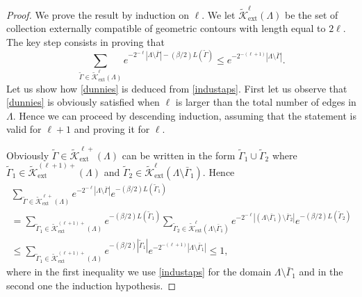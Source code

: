 \documentclass[10pt]{amsart}
\let\mathcal\mathscr
\numberwithin{equation}{section}
\theoremstyle{plain}
\theoremstyle{definition}
\newcommand{\ext}{\mathrm{ext}}
\newcommand{\cK}{{\ensuremath{\mathcal K}} }
\newcommand{\gb}{\beta}
\newcommand{\gG}{\Gamma}
\newcommand{\gL}{\Lambda}
\begin{document}
\begin{proof}
We prove the result by induction on $\ell$. We let $\tilde \cK^{\ell}_{\ext}(\gL)$ be
the set of collection externally compatible of geometric contours with length equal to $2\ell$.
The key step consists in proving that
\begin{equation}\label{industaps}
\sum_{\tilde \gG\in \tilde \cK^{\ell}_{\ext}(\gL)} e^{-2^{-\ell} |\gL\setminus \bar \gG|-(\gb/2) L(\tilde\gG)}\le e^{-2^{-(\ell+1)} |\gL\setminus \bar \gG|}.
\end{equation}
Let us show how \eqref{dunnies} is deduced from \eqref{industaps}.
First let us observe that \eqref{dunnies} is obviously satisfied when $\ell$ is larger than the total number of edges in $\gL$. Hence we can proceed
by descending induction, assuming that the
statement is valid for $\ell+1$ and proving it for $\ell$.

Obviously $\tilde \gG \in \tilde \cK^{\ell+}_{\ext}(\gL)$ can be written in the form $\tilde \gG_1\cup \tilde \gG_2$ where $\tilde \gG_1\in \tilde \cK^{(\ell+1)+}_{\ext}(\gL)$
and $\tilde \gG_2\in \tilde\cK^{\ell}_{\ext}(\gL \setminus \bar \gG_1)$.
Hence\vspace*{-3pt}
\begin{multline*}
\sum_{\tilde \gG\in \tilde \cK^{\ell+}_{\ext}(\gL)} e^{-2^{-\ell} |\gL\setminus \bar \gG| }e^{-(\gb/2) L(\tilde\gG_1)}\\[-5pt]
=\sum_{\tilde \gG_1\in \tilde \cK^{(\ell+1)+}_{\ext}(\gL)} e^{-(\gb/2) L(\tilde\gG_1)}\sum_{\tilde \gG_2\in \tilde \cK^{\ell}_{\ext}(\gL\setminus \bar \gG_1)}
e^{-2^{-\ell} |(\gL\setminus \bar \gG_1)\setminus \bar \gG_2|} e^{-(\gb/2) L(\tilde\gG_2)}
\\ \le \sum_{\tilde \gG_1\in \tilde \cK^{(\ell+1)+}_{\ext}(\gL)} e^{-(\gb/2) |\tilde\gG_1|} e^{-2^{-(\ell+1)} |\gL\setminus \bar \gG_1|} \le 1,
\end{multline*}
where in the first inequality we use \eqref{industaps} for the domain $\gL\setminus \bar \gG_1$ and in the second one the induction hypothesis.


\end{proof}
\end{document}
